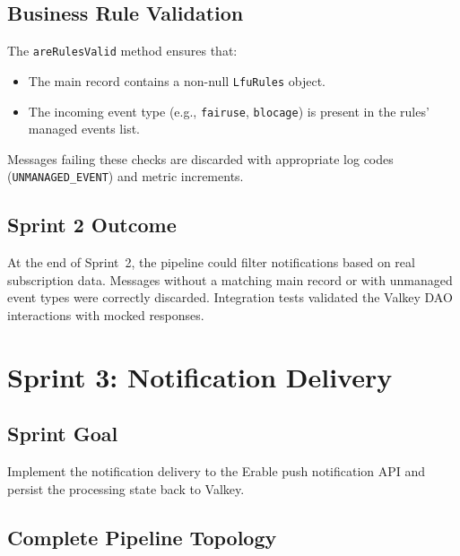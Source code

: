 \subsection{Business Rule Validation}

The \texttt{areRulesValid} method ensures that:
\begin{itemize}
    \item The main record contains a non-null \texttt{LfuRules} object.
    \item The incoming event type (e.g., \texttt{fairuse}, \texttt{blocage}) is present in the rules' managed events list.
\end{itemize}

Messages failing these checks are discarded with appropriate log codes (\texttt{UNMANAGED\_EVENT}) and metric increments.

\subsection{Sprint 2 Outcome}

At the end of Sprint~2, the pipeline could filter notifications based on real subscription data. Messages without a matching main record or with unmanaged event types were correctly discarded. Integration tests validated the Valkey DAO interactions with mocked responses.

\section{Sprint 3: Notification Delivery}
\label{sec:sprint3}

\subsection{Sprint Goal}

Implement the notification delivery to the Erable push notification API and persist the processing state back to Valkey.

\subsection{Complete Pipeline Topology}

